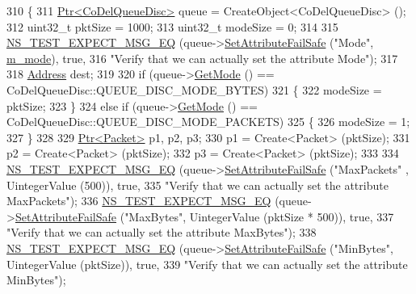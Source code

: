 \begin{DoxyCode}
310 \{
311   \hyperlink{classns3_1_1Ptr}{Ptr<CoDelQueueDisc>} queue = CreateObject<CoDelQueueDisc> ();
312   uint32\_t pktSize = 1000;
313   uint32\_t modeSize = 0;
314 
315   \hyperlink{group__testing_ga7304ba46a28d8cf08dfdfd6499cf7068}{NS\_TEST\_EXPECT\_MSG\_EQ} (queue->\hyperlink{classns3_1_1ObjectBase_aa7d333004e970f925a4ed5df275541b5}{SetAttributeFailSafe} (\textcolor{stringliteral}{"Mode"}, 
      \hyperlink{classCoDelQueueDiscBasicOverflow_a8300058029d180f082de23dbde5b1ba0}{m\_mode}), \textcolor{keyword}{true},
316                          \textcolor{stringliteral}{"Verify that we can actually set the attribute Mode"});
317 
318   \hyperlink{classns3_1_1Address}{Address} dest;
319 
320   \textcolor{keywordflow}{if} (queue->\hyperlink{classns3_1_1CoDelQueueDisc_ab4e1b3733d0961c823b6fa7d2e36c0bb}{GetMode} () == CoDelQueueDisc::QUEUE\_DISC\_MODE\_BYTES)
321     \{
322       modeSize = pktSize;
323     \}
324   \textcolor{keywordflow}{else} \textcolor{keywordflow}{if} (queue->\hyperlink{classns3_1_1CoDelQueueDisc_ab4e1b3733d0961c823b6fa7d2e36c0bb}{GetMode} () == CoDelQueueDisc::QUEUE\_DISC\_MODE\_PACKETS)
325     \{
326       modeSize = 1;
327     \}
328 
329   \hyperlink{classns3_1_1Ptr}{Ptr<Packet>} p1, p2, p3;
330   p1 = Create<Packet> (pktSize);
331   p2 = Create<Packet> (pktSize);
332   p3 = Create<Packet> (pktSize);
333 
334   \hyperlink{group__testing_ga7304ba46a28d8cf08dfdfd6499cf7068}{NS\_TEST\_EXPECT\_MSG\_EQ} (queue->\hyperlink{classns3_1_1ObjectBase_aa7d333004e970f925a4ed5df275541b5}{SetAttributeFailSafe} (\textcolor{stringliteral}{"MaxPackets"}
      , UintegerValue (500)), \textcolor{keyword}{true},
335                          \textcolor{stringliteral}{"Verify that we can actually set the attribute MaxPackets"});
336   \hyperlink{group__testing_ga7304ba46a28d8cf08dfdfd6499cf7068}{NS\_TEST\_EXPECT\_MSG\_EQ} (queue->\hyperlink{classns3_1_1ObjectBase_aa7d333004e970f925a4ed5df275541b5}{SetAttributeFailSafe} (\textcolor{stringliteral}{"MaxBytes"}, 
      UintegerValue (pktSize * 500)), \textcolor{keyword}{true},
337                          \textcolor{stringliteral}{"Verify that we can actually set the attribute MaxBytes"});
338   \hyperlink{group__testing_ga7304ba46a28d8cf08dfdfd6499cf7068}{NS\_TEST\_EXPECT\_MSG\_EQ} (queue->\hyperlink{classns3_1_1ObjectBase_aa7d333004e970f925a4ed5df275541b5}{SetAttributeFailSafe} (\textcolor{stringliteral}{"MinBytes"}, 
      UintegerValue (pktSize)), \textcolor{keyword}{true},
339                          \textcolor{stringliteral}{"Verify that we can actually set the attribute MinBytes"});

\end{DoxyCode}
